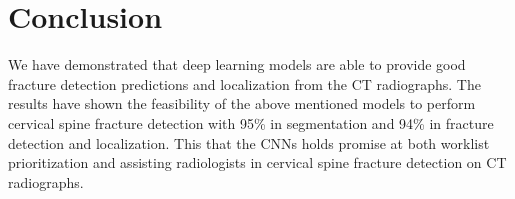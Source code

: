 \documentclass[pdflatex,sn-mathphys]{sn-jnl}%
\theoremstyle{thmstyleone}%
\theoremstyle{thmstyletwo}%
\theoremstyle{thmstylethree}%
\begin{document}
\section{Conclusion}\label{sec13}

We have demonstrated that deep learning models are able to provide good fracture detection predictions and localization from the CT radiographs. The results have shown the feasibility of the above mentioned models to perform cervical spine fracture detection with 95\% in segmentation and 94\% in fracture detection and localization. This that the CNNs holds promise at both worklist prioritization and assisting radiologists in cervical spine fracture detection on CT radiographs.

\newpage



%

\end{document}
